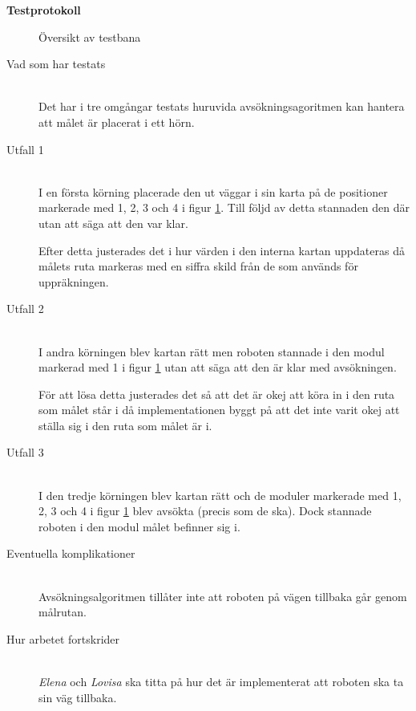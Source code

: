 \documentclass[11pt]{article}
\begin{document}
\begin{center}

{\Huge\bfseries Testprotokoll}
\vspace{4em}
\end{center}

\begin{flushleft}


\begin{figure}[htbp]
\centering
\noindent\resizebox{.4\linewidth}{!}{
	}
	\caption{Översikt av testbana\label{bana}}	
\end{figure}

\begin{description}
\item[Vad som har testats] \hfill \\
Det har i tre omgångar testats huruvida avsökningsagoritmen kan hantera att målet är placerat i ett hörn.

\vspace{1em}
\item[Utfall 1] \hfill \\
I en första körning placerade den ut väggar i sin karta på de positioner markerade med 1, 2, 3 och 4 i figur \ref{bana}. Till följd av detta stannaden den där utan att säga att den var klar.

Efter detta justerades det i hur värden i den interna kartan uppdateras då målets ruta markeras med en siffra skild från de som används för uppräkningen.

\item[Utfall 2] \hfill \\
I andra körningen blev kartan rätt men roboten stannade i den modul markerad med 1 i figur \ref{bana} utan att säga att den är klar med avsökningen.

För att lösa detta justerades det så att det är okej att köra in i den ruta som målet står i då implementationen byggt på att det inte varit okej att ställa sig i den ruta som målet är i.

\item[Utfall 3] \hfill \\
I den tredje körningen blev kartan rätt och de moduler markerade med 1, 2, 3 och 4 i figur \ref{bana} blev avsökta (precis som de ska). Dock stannade roboten i den modul målet befinner sig i.

\pagebreak
\vspace{1em}
\item[Eventuella komplikationer] \hfill \\
Avsökningsalgoritmen tillåter inte att roboten på vägen tillbaka går genom målrutan.

\vspace{1em}

\item[Hur arbetet fortskrider] \hfill \\
\emph{Elena} och \emph{Lovisa} ska titta på hur det är implementerat att roboten ska ta sin väg tillbaka.


\end{description}

\end{flushleft}
\end{document}

